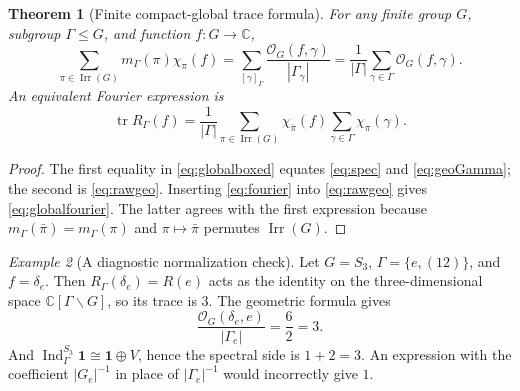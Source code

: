 \documentclass[12pt]{article}
\newtheorem{theorem}{Theorem}[section]
\theoremstyle{remark}
\newtheorem{example}[theorem]{Example}
\newcommand{\C}{\mathbb C}
\newcommand{\Ind}{\operatorname{Ind}}
\newcommand{\tr}{\operatorname{tr}}
\newcommand{\id}{\mathbf 1}
\newcommand{\Irr}{\operatorname{Irr}}
\newcommand{\Orb}{\mathcal O}
\begin{document}
\begin{theorem}[Finite compact-global trace formula]\label{thm:global}
For any finite group $G$, subgroup $\Gamma\leq G$, and function
$f:G\to\C$,
\begin{equation}\label{eq:globalboxed}
 \boxed{\displaystyle
 \sum_{\pi\in\Irr(G)}m_\Gamma(\pi)\chi_\pi(f)
 =\sum_{[\gamma]_\Gamma}
      \frac{\Orb_G(f,\gamma)}{|\Gamma_\gamma|}
 =\frac1{|\Gamma|}\sum_{\gamma\in\Gamma}
      \Orb_G(f,\gamma).}
\end{equation}
An equivalent Fourier expression is
\begin{equation}\label{eq:globalfourier}
 \tr R_\Gamma(f)
 =\frac1{|\Gamma|}\sum_{\pi\in\Irr(G)}
     \chi_{\bar\pi}(f)\sum_{\gamma\in\Gamma}\chi_\pi(\gamma).
\end{equation}
\end{theorem}
\begin{proof}
The first equality in \eqref{eq:globalboxed} equates
\eqref{eq:spec} and \eqref{eq:geoGamma}; the second is
\eqref{eq:rawgeo}. Inserting \eqref{eq:fourier} into
\eqref{eq:rawgeo} gives \eqref{eq:globalfourier}. The latter agrees
with the first expression because $m_\Gamma(\bar\pi)
=m_\Gamma(\pi)$ and $\pi\mapsto\bar\pi$ permutes $\Irr(G)$.
\end{proof}
\begin{example}[A diagnostic normalization check]\label{ex:s3global}
Let $G=S_3$, $\Gamma=\{e,(12)\}$, and $f=\delta_e$.
Then $R_\Gamma(\delta_e)=R(e)$ acts as the identity on the three-dimensional
space $\C[\Gamma\backslash G]$, so its trace is $3$.
The geometric formula gives
\[
 \frac{\Orb_G(\delta_e,e)}{|\Gamma_e|}
 =\frac{6}{2}=3.
\]
And $\Ind_\Gamma^{S_3}\id\cong\id\oplus V$, hence the
spectral side is $1+2=3$. An expression with the coefficient
$|G_e|^{-1}$ in place of $|\Gamma_e|^{-1}$ would incorrectly give $1$.
\end{example}
\end{document}
